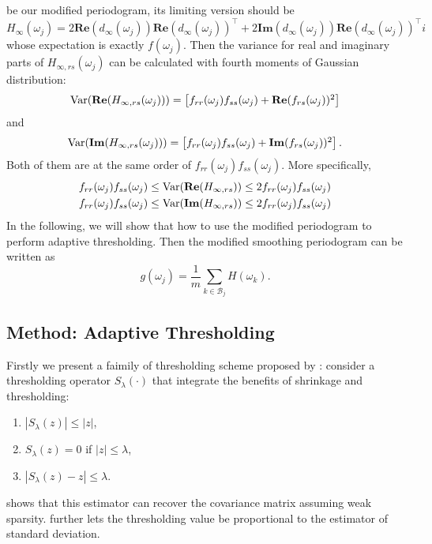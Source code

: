 be our modified periodogram, its limiting version should be 
\begin{equation}
H_\infty(\omega_j) = 2\mathbf{Re}(d_{\infty}(\omega_j))  \mathbf{Re}(d_{\infty}(\omega_j))^\top+2\mathbf{Im}(d_{\infty}(\omega_j))  \mathbf{Re}(d_{\infty}(\omega_j))^\top i
\end{equation}
whose expectation is exactly $f(\omega_j)$. Then the variance for 
real and imaginary parts of $H_{\infty, rs}(\omega_j)$ can be calculated with fourth moments of Gaussian distribution: 
\begin{equation}
\begin{array}{cc}
\mathrm{Var}(\mathbf{Re}(H_{\infty, rs}(\omega_j))) = \left[f_{rr}(\omega_j)f_{ss}(\omega_j)+\mathbf{Re}(f_{rs}(\omega_j))^2\right]
\end{array}
\end{equation}
and 
\begin{equation}
\begin{array}{cc}
\mathrm{Var}(\mathbf{Im}(H_{\infty, rs}(\omega_j))) = \left[f_{rr}(\omega_j)f_{ss}(\omega_j)+\mathbf{Im}(f_{rs}(\omega_j))^2\right].
\end{array}
\end{equation}
Both of them are at the same order of $f_{rr}(\omega_j)f_{ss}(\omega_j)$. More specifically,
\begin{equation}
\begin{aligned}
& f_{rr}(\omega_j)f_{ss}(\omega_j)\le \mathrm{Var}({\bf Re}(H_{\infty, rs}))\le 2f_{rr}(\omega_j)f_{ss}(\omega_j) \\
& f_{rr}(\omega_j)f_{ss}(\omega_j)\le \mathrm{Var}({\bf Im}(H_{\infty, rs}))\le 2f_{rr}(\omega_j)f_{ss}(\omega_j)
\end{aligned}
\end{equation}
In the following, we will show that how to use the modified periodogram to perform adaptive thresholding. Then the modified smoothing periodogram can be written as 
\begin{equation}
g(\omega_j) = \frac{1}{m}\sum_{k\in \mathcal{B}_j} H(\omega_k). 
\end{equation}



\subsection{Method: Adaptive Thresholding}
Firstly we present a faimily of thresholding scheme proposed by \cite{rothman2009generalized}: consider a thresholding operator $S_\lambda(\cdot)$ that integrate the benefits of shrinkage and thresholding: 
\begin{enumerate}[(1)]
\item $|S_\lambda(z)|\le |z|$,
\item $S_\lambda(z) = 0$ if $|z|\le \lambda$,
\item $|S_\lambda(z)-z|\le \lambda $.
\end{enumerate}
\cite{rothman2009generalized} shows that this estimator can recover the covariance matrix assuming weak sparsity. \cite{cai2011adaptive} further lets the thresholding value be proportional to the estimator of standard deviation. 


